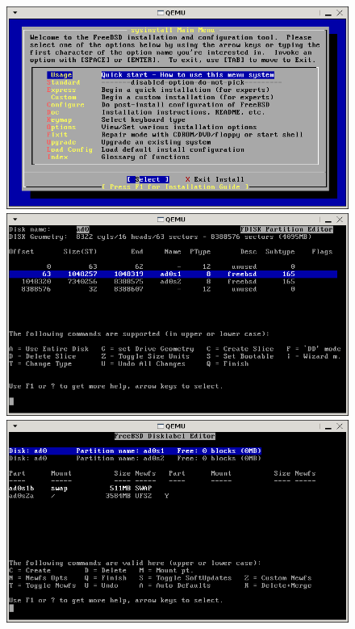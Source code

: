 \documentclass[mingoth,a4paper]{jsarticle}
\begin{document}
\begin{figure}[H]
 \begin{multicols}{2}
 \includegraphics[width=\hsize]{image200708/kfreebsd-install-0.png}
 \includegraphics[width=\hsize]{image200708/kfreebsd-install-1.png}
 \includegraphics[width=\hsize]{image200708/kfreebsd-install-2.png}

\end{multicols}
\end{figure}
\end{document}
